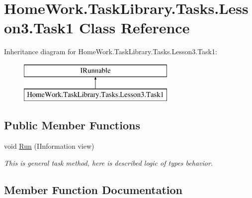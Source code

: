 \hypertarget{class_home_work_1_1_task_library_1_1_tasks_1_1_lesson3_1_1_task1}{}\section{Home\+Work.\+Task\+Library.\+Tasks.\+Lesson3.\+Task1 Class Reference}
\label{class_home_work_1_1_task_library_1_1_tasks_1_1_lesson3_1_1_task1}
Inheritance diagram for Home\+Work.\+Task\+Library.\+Tasks.\+Lesson3.\+Task1\+:\begin{figure}[H]
\begin{center}
\leavevmode
\includegraphics[height=2.000000cm]{class_home_work_1_1_task_library_1_1_tasks_1_1_lesson3_1_1_task1}
\end{center}
\end{figure}
\subsection*{Public Member Functions}
\begin{DoxyCompactItemize}
\item 
void \mbox{\hyperlink{class_home_work_1_1_task_library_1_1_tasks_1_1_lesson3_1_1_task1_aeaa6e79f3cd1b489a09f5c1bff5dbb5f}{Run}} (I\+Information view)
\begin{DoxyCompactList}\small\item\em This is general task method, here is described logic of types behavior. \end{DoxyCompactList}\end{DoxyCompactItemize}


\subsection{Member Function Documentation}
\mbox{\label{class_home_work_1_1_task_library_1_1_tasks_1_1_lesson3_1_1_task1_aeaa6e79f3cd1b489a09f5c1bff5dbb5f}} 
